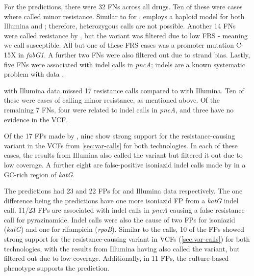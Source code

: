 For the \drprg{} \ont{} predictions, there were 32 FNs across all drugs. Ten of these were cases where \mykrobe{} called minor resistance. Similar to \mykrobe{} for \ont{}, \drprg{} employs a haploid model for both Illumina and \ont{}; therefore, heterozygous calls are not possible. Another 14 FNs were called resistance by \drprg{} \ont{}, but the variant was filtered due to low FRS - meaning we call susceptible. All but one of these FRS cases was a promoter mutation C-15X in \textit{fabG1}. A further two FNs were also filtered out due to strand bias. Lastly, five FNs were associated with indel calls in \textit{pncA}; indels are a known systematic problem with \ont{} data \cite{watson2019}.

\drprg{} with Illumina data missed 17 resistance calls compared to \mykrobe{} with Illumina. Ten of these were cases of \mykrobe{} calling minor resistance, as mentioned above. Of the remaining 7 FNs, four were related to indel calls in \textit{pncA}, and three have no evidence in the \drprg{} VCF.

Of the 17 FPs made by \mykrobe{} \ont{}, nine show strong support for the resistance-causing variant in the VCFs from \autoref{sec:var-calls} for both technologies. In each of these cases, the \mykrobe{} results from Illumina also called the variant but filtered it out due to low coverage. A further eight are false-positive isoniazid indel calls made by \ont{} in a GC-rich region of \textit{katG}.

The \drprg{} predictions had 23 and 22 FPs for \ont{} and Illumina data respectively. The one difference being the \ont{} predictions have one more isoniazid FP from a \textit{katG} indel call. 11/23 FPs are associated with indel calls in \textit{pncA} causing a false resistance call for pyrazinamide. Indel calls were also the cause of two FPs for isoniazid (\textit{katG}) and one for rifampicin (\textit{rpoB}). Similar to the \mykrobe{} \ont{} calls, 10 of the \drprg{} FPs showed strong support for the resistance-causing variant in VCFs (\autoref{sec:var-calls}) for both technologies, with the \mykrobe{} results from Illumina having also called the variant, but filtered out due to low coverage. Additionally, in 11 FPs, the culture-based phenotype supports the \drprg{} prediction.


